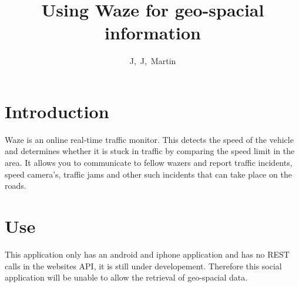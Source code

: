 \documentclass{article}
\title{Using Waze for geo-spacial information}
\author{J,\ J,\ Martin}
\begin{document}
\maketitle
\section{Introduction}
Waze is an online real-time traffic monitor. This detects the speed of the vehicle and determines whether it is stuck in traffic by comparing the speed limit in the area. It allows you to communicate to fellow wazers and report traffic incidents, speed camera's, traffic jams and other such incidents that can take place on the roads.
\section{Use}
This application only has an android and iphone application and has no REST calls in the websites API, it is still under developement. Therefore this social application will be unable to allow the retrieval of geo-spacial data.
\end{document}
